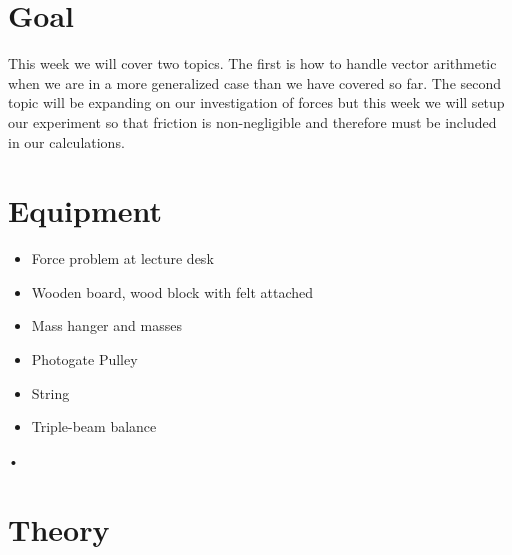 \documentclass[main.tex]{subfiles}
\begin{document}
\section*{Goal}
This week we will cover two topics. The first is how to handle vector arithmetic when we are in a more generalized case than we have covered so far. The second topic will be expanding on our investigation of forces but this week we will setup our experiment so that friction is non-negligible and therefore must be included in our calculations.

\section*{Equipment}
\begin{itemize}
\item
Force problem at lecture desk
\item
Wooden board, wood block with felt attached
\item
Mass hanger and masses
\item
Photogate Pulley
\item
String
\item
Triple-beam balance
\end{itemize}•

\section*{Theory}
\end{document}
